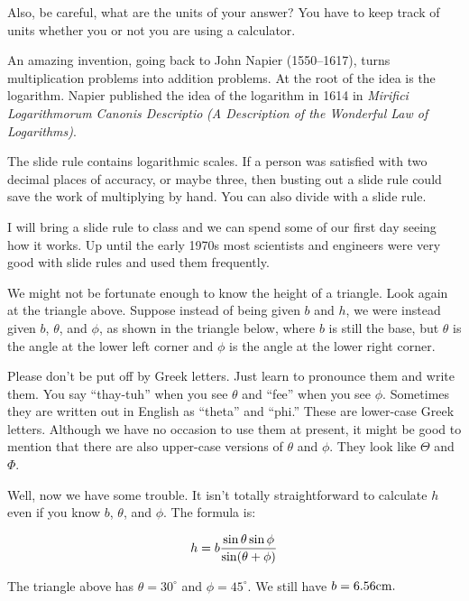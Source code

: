 Also, be careful, what are the units of your answer? You have to keep track of units whether you or not you are using a calculator.
\bigskip

\nobreak\bigskip

\noindent An amazing invention, going back to John Napier (1550--1617), turns multiplication problems into addition problems. At the root of the idea is the logarithm.
Napier published the idea of the logarithm in 1614 in {\it Mirifici Logarithmorum Canonis Descriptio} {\it (A Description of the Wonderful Law of Logarithms)}.

The slide rule contains logarithmic scales. If a person was satisfied with two decimal places of accuracy, or maybe three, then busting out a slide rule could save
the work of multiplying by hand. You can also divide with a slide rule.

I will bring a slide rule to class and we can spend some of our first day seeing how it works. Up until the early 1970s most scientists and engineers were very good 
with slide rules and used them frequently.
\bigskip

\nobreak\bigskip

\noindent We might not be fortunate enough to know the height of a triangle. Look again at the triangle above. Suppose instead of being given $b$ and $h$, we were instead given $b$, $\theta$, and $\phi$, as shown in the triangle below, where $b$ is still the base, but $\theta$ is the angle at the lower left corner and $\phi$ is the angle at the lower right corner.
\nobreak\bigskip

\midinsert
\centerline{}
\endinsert
\bigskip

\noindent Please don't be put off by Greek letters. Just learn to pronounce them and write them. You say ``thay-tuh'' when you see $\theta$ and ``fee'' when you see $\phi$. Sometimes they are written out in English as ``theta'' and ``phi.'' These are lower-case Greek letters. Although we have no occasion to use them at present, it might be good to mention that there are also upper-case versions of $\theta$ and $\phi$. They look like $\Theta$ and $\Phi$.

Well, now we have some trouble. It isn't totally straightforward to calculate $h$ even if you know $b$, $\theta$, and $\phi$. The formula is:

$$h=b{\sin\theta \sin\phi \over \sin (\theta + \phi)}$$

\noindent The triangle above has $\theta=30^{\circ}$ and $\phi=45^{\circ}$. We still have $b=6.56 {\rm cm}.$

